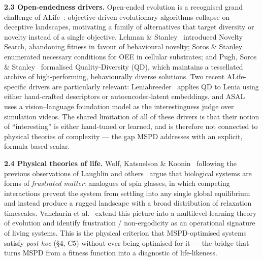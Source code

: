 \documentclass[
  11pt,
]{article}
\begin{document}
\textbf{2.3 Open-endedness drivers.}
Open-ended evolution is a recognised grand challenge of
ALife~\cite{stanley2019why}: objective-driven evolutionary algorithms
collapse on deceptive landscapes, motivating a family of alternatives
that target diversity or novelty instead of a single objective.
Lehman \& Stanley~\cite{lehman2011abandoning} introduced Novelty
Search, abandoning fitness in favour of behavioural novelty; Soros \&
Stanley~\cite{soros2014identifying} enumerated necessary conditions for
OEE in cellular substrates; and Pugh, Soros \&
Stanley~\cite{pugh2016quality} formalised Quality-Diversity (QD),
which maintains a tessellated archive of high-performing,
behaviourally diverse solutions. Two recent ALife-specific drivers
are particularly relevant:
Leniabreeder~\cite{faldor2024leniabreeder} applies QD to Lenia using
either hand-crafted descriptors or autoencoder-latent embeddings, and
ASAL~\cite{kumar2024automating} uses a vision--language foundation
model as the interestingness judge over simulation videos. The shared
limitation of all of these drivers is that their notion of
``interesting'' is either hand-tuned or learned, and is therefore not
connected to physical theories of complexity --- the gap MSPD addresses
with an explicit, formula-based scalar.

\textbf{2.4 Physical theories of life.}
Wolf, Katsnelson \& Koonin~\cite{wolf2018physical} following the previous
observations of Laughlin and others~\cite{laughlin1,laughlin2} argue that
biological systems are forms of \emph{frustrated matter}: analogues of
spin glasses, in which competing interactions prevent the system from
settling into any single global equilibrium and instead produce a
rugged landscape with a broad distribution of relaxation timescales.
Vanchurin et al.~\cite{vanchurin2022toward} extend this picture into a
multilevel-learning theory of evolution and identify frustration /
non-ergodicity as an operational signature of living systems. This is
the physical criterion that MSPD-optimised systems satisfy
\emph{post-hoc} (\S4, C5) without ever being optimised for it --- the
bridge that turns MSPD from a fitness function into a diagnostic of
life-likeness.
\end{document}
